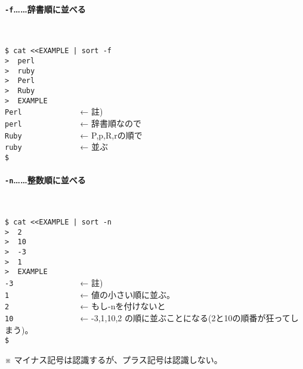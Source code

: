 \paragraph*{\verb|-f|……辞書順に並べる}　\\
\begin{screen}
	\verb!$ cat <<EXAMPLE | sort -f! \return \\
	\verb!>  perl! \return \\
	\verb!>  ruby! \return \\
	\verb!>  Perl! \return \\
	\verb!>  Ruby! \return \\
	\verb!>  EXAMPLE! \return \\
	\verb!Perl             !  ← 註) \\
	\verb!perl             !  ← 辞書順なので \\
	\verb!Ruby             !  ← P,p,R,rの順で \\
	\verb!ruby             !  ← 並ぶ \\
	\verb!$ !
\end{screen}

\paragraph*{\verb|-n|……整数順に並べる}　\\
\begin{screen}
	\verb!$ cat <<EXAMPLE | sort -n! \return \\
	\verb!>  2! \return \\
	\verb!>  10! \return \\
	\verb!>  -3! \return \\
	\verb!>  1! \return \\
	\verb!>  EXAMPLE! \return \\
	\verb!-3               !  ← 註) \\
	\verb!1                !  ← 値の小さい順に並ぶ。 \\
	\verb!2                !  ← もし-nを付けないと \\
	\verb!10               !  ← -3,1,10,2 の順に並ぶことになる(2と10の順番が狂ってしまう)。 \\
	\verb!$ !
\end{screen}

\noindent
※ マイナス記号は認識するが、プラス記号は認識しない。


